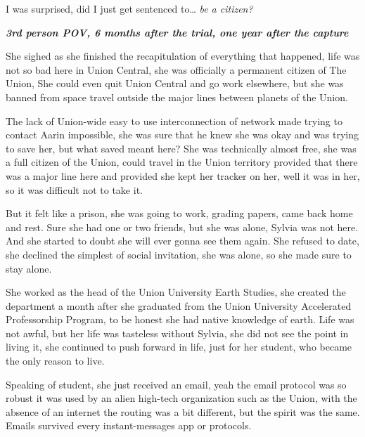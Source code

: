 \documentclass[colorlinks,12pt,a4paper]{book}
\begin{document}
I was surprised, did I just get sentenced to… \textit{be a citizen?}\par
\bigskip



\textit{\textbf{3rd person POV, 6 months after the trial, one year after the capture}}\par
\bigskip

She sighed as she finished the recapitulation of everything that happened, life was not so bad here in Union Central, 
she was officially a permanent citizen of The Union, She could even quit Union Central and go work elsewhere, but she 
was banned from space travel outside the major lines between planets of the Union.\par
\bigskip

The lack of Union-wide easy to use interconnection of network made trying to contact Aarin impossible, she was 
sure that he knew she was okay and was trying to save her, but what saved meant here? She was technically almost free, 
she was a full citizen of the Union, could travel in the Union territory provided that there was a major line here and 
provided she kept her tracker on her, well it was in her, so it was difficult not to take it.\par
\bigskip

But it felt like a prison, she was going to work, grading papers, came back home and rest. Sure she had one or two friends,
but she was alone, Sylvia was not here. And she started to doubt she will ever gonna see them again. She refused to date, 
she declined the simplest of social invitation, she was alone, so she made sure to stay alone.\par
\bigskip

She worked as the head of the Union University Earth Studies, she created the department a month after she graduated 
from the Union University Accelerated Professorship Program, to be honest she had native knowledge of earth. Life was 
not awful, but her life was tasteless without Sylvia, she did not see the point in living it, she continued to push forward 
in life, just for her student, who became the only reason to live.\par
\bigskip

Speaking of student, she just received an email, yeah the email protocol was so robust it was used by an alien high-tech 
organization such as the Union, with the absence of an internet the routing was a bit different, but the spirit was the 
same. Emails survived every instant-messages app or protocols.\par
\bigskip
\end{document}
